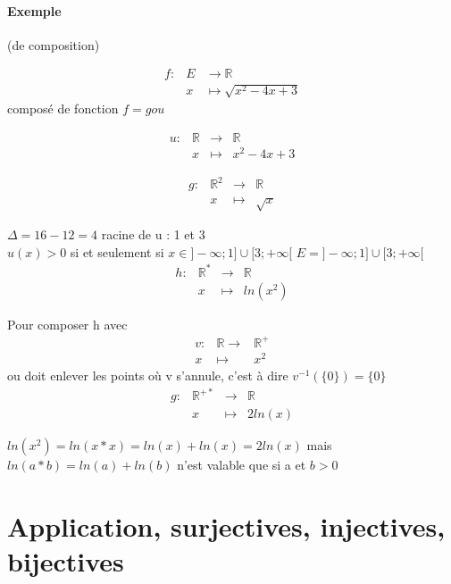 \paragraph{Exemple} (de composition)

\[\begin{array}{rcl}
	f: & E & \rightarrow \mathbb{R} \\
	& x & \mapsto \sqrt{x^2 - 4x + 3}
\end{array}\]
composé de fonction $f=gou$

\[\begin{array}{rccl}
	u : & \mathbb{R} & \rightarrow & \mathbb{R} \\
	& x & \mapsto & x^2-4x+3
\end{array}\]

\[\begin{array}{rccl}
	g : & \mathbb{R}^2 & \rightarrow & \mathbb{R} \\
	 & x & \mapsto & \sqrt{x}
\end{array}\]

$\Delta = 16 - 12 = 4$
racine de u : 1 et 3
~\\

$u(x) > 0$ si et seulement si $ x \in ]-\infty; 1] \cup [3; +\infty[$
$E = ]-\infty; 1] \cup [3; +\infty[$
~\\

\[\begin{array}{rccl}
	h : & \mathbb{R}^* & \rightarrow & \mathbb{R} \\
		& x & \mapsto & ln(x^2)
\end{array}\]

Pour composer h avec \[\begin{array}{rcl}
		v : &\mathbb{R} \rightarrow &\mathbb{R}^+\\
		x &\mapsto & x^2\end{array}\] ou doit enlever les points où v s'annule, c'est à dire $v^{-1}(\{0\}) = \{0\}$
~\\

\[\begin{array}{rccl}
g : &  \mathbb{R}^{+*} & \rightarrow & \mathbb{R} \\
	   & x & \mapsto & 2ln(x)
\end{array}\]

$ln(x^2) = ln(x*x) = ln(x) + ln(x) = 2ln(x)$
mais $ln(a*b) = ln(a) + ln(b)$ n'est valable que si a et $b > 0$

\section{Application, surjectives, injectives, bijectives}
